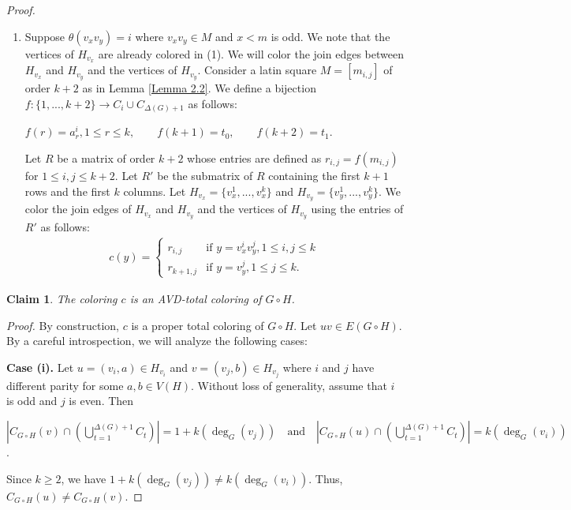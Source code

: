 \documentclass[12pt]{article}
\theoremstyle{definition}
\newtheorem{claim}{Claim}
\begin{document}
\begin{proof}
\begin{enumerate}
    \item Suppose $\theta(v_xv_{y})=i$ where $v_xv_y\in M$ and $x<m$ is odd. We note that the vertices of $H_{v_x}$ are already colored in (1). 
    We will color the join edges between $H_{v_x}$ and $H_{v_{y}}$ and the vertices of $H_{v_{y}}$. 
    Consider a latin square $M=[m_{i,j}]$ of order $k+2$  as in Lemma \ref{Lemma 2.2}. 
    We define a bijection $f:\{1,...,k+2\}\rightarrow C_{i}\cup C_{\Delta(G)+1}$ as follows:
\begin{center}
    $f(r)=a_{r}^{i}, 1\leq r\leq k, \qquad f(k+1)=t_0, \qquad f(k+2)=t_1.$
\end{center}
    Let $R$ be a matrix of order $k+2$ whose entries are defined as $r_{i,j}=f(m_{i,j})$ for $1\leq i,j\leq k+2$.
    Let $R'$ be the submatrix of $R$ containing the first $k+1$ rows and the first $k$ columns. 
    Let $H_{v_x}=\{v_x^1,...,v_x^k\}$ and $H_{v_{y}}=\{v_{y}^1,...,v_{y}^k\}$.
    We color the join edges of $H_{v_x}$ and $H_{v_{y}}$ and the vertices of $H_{v_{y}}$ using the entries of $R'$ as follows:
\begin{align*}
c(y)=
\begin{cases}
r_{i,j} & \text{if } y=v_x^{i}v_{y}^j,   1\leq i,j \leq k 
\\[2mm]
r_{k+1,j} & \text{if } y=v_{y}^{j}, 1\leq j \leq k. 
\end{cases}
\end{align*}
\end{enumerate}

\begin{claim}\label{Claim 3}
{\em The coloring $c$ is an AVD-total coloring of $G\circ H$.}
\end{claim}

\textit{Proof.}
By construction, $c$ is a proper total coloring of $G\circ H$.
Let $uv\in E(G\circ H)$. By a careful introspection, we will analyze the following cases:

\textbf{Case (i).}
Let $u=(v_i,a)\in H_{v_i}$ and $v=(v_j,b)\in H_{v_j}$ where $i$ and $j$ have different parity for some $a,b\in V(H)$.
Without loss of generality, assume that $i$ is odd and $j$ is even. Then 
\begin{center}
    $|C_{G\circ H}(v)\cap (\bigcup\limits_{t=1}^{\Delta(G)+1} C_t)|= 
    1 + k(\deg_{G}(v_j)) \quad \text{and} \quad
|C_{G\circ H}(u)\cap (\bigcup\limits_{t=1}^{\Delta(G)+1}C_t)|=k(\deg_{G}(v_i))$.
\end{center}

Since $k\geq 2$, we have $1 + k(\deg_{G}(v_j))\neq k(\deg_{G}(v_i))$. Thus,
$C_{G\circ H}(u)\neq C_{G\circ H}(v)$.


\end{proof}
\end{document}
